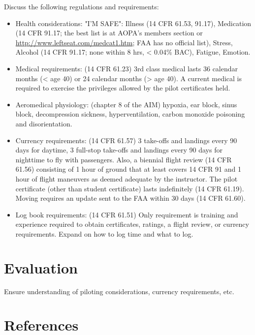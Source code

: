 \documentclass[twoside,openright]{report}
\begin{document}
Discuss the following regulations and requirements:

\begin{itemize}
  \item Health considerations: "I'M SAFE": Illness (14 CFR 61.53, 91.17),
    Medication (14 CFR 91.17; the best list is at AOPA's members section or
    \url{http://www.leftseat.com/medcat1.htm}; FAA has no official list),
    Stress, Alcohol (14 CFR 91.17; none within 8 hrs, < 0.04\% BAC), Fatigue,
    Emotion.

  \item Medical requirements: (14 CFR 61.23) 3rd class medical lasts 36
    calendar months (< age 40) or 24 calendar months (> age 40). A current
    medical is required to exercise the privileges allowed by the pilot
    certificates held.

  \item Aeromedical physiology: (chapter 8 of the AIM) hypoxia, ear block,
    sinus block, decompression sickness, hyperventilation, carbon monoxide
    poisoning and disorientation.

  \item Currency requirements: (14 CFR 61.57) 3 take-offs and landings every 90
    days for daytime, 3 full-stop take-offs and landings every 90 days for
    nighttime to fly with passengers. Also, a biennial flight review (14 CFR
    61.56) consisting of 1 hour of ground that at least covers 14 CFR 91 and 1
    hour of flight maneuvers as deemed adequate by the instructor. The pilot
    certificate (other than student certificate) lasts indefinitely (14 CFR
    61.19). Moving requires an update sent to the FAA within 30 days (14 CFR
    61.60).

  \item Log book requirements: (14 CFR 61.51) Only requirement is training and
    experience required to obtain certificates, ratings, a flight review, or
    currency requirements. Expand on how to log time and what to log.

\end{itemize}

\section{Evaluation}

Ensure understanding of piloting considerations, currency requirements, etc.

\section{References}
\end{document}

